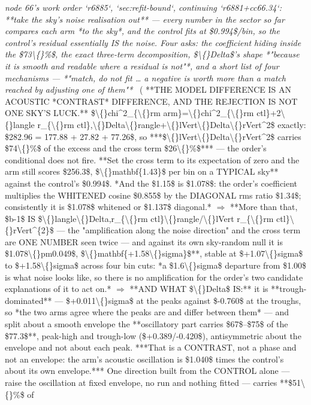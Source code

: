 \begin{description}
\textit{node 66's work order `r6885`, `sec:refit-bound`, continuing `r6881+cc66.34`: **take the sky's noise realisation out** --- every number in the sector so far compares each arm *to the sky*, and the control fits at \$0.994\$/bin, so the control's residual essentially IS the noise. Four asks: the coefficient hiding inside the \$73\textbackslash\{\}\%\$, the exact three-term decomposition, \$\textbackslash\{\}Delta\$'s shape *"because it is smooth and readable where a residual is not"*, and a short list of four mechanisms --- *"match, do not fit \ldots{} a negative is worth more than a match reached by adjusting one of them"*} \ ( **THE MODEL DIFFERENCE IS AN ACOUSTIC *CONTRAST* DIFFERENCE, AND THE REJECTION IS NOT ONE SKY'S LUCK.** \$\textbackslash\{\}chi\textasciicircum{}2\_\{\textbackslash\{\}rm arm\}=\textbackslash\{\}chi\textasciicircum{}2\_\{\textbackslash\{\}rm ctl\}+2\textbackslash\{\}langle r\_\{\textbackslash\{\}rm ctl\},\textbackslash\{\}Delta\textbackslash\{\}rangle+\textbackslash\{\}lVert\textbackslash\{\}Delta\textbackslash\{\}rVert\textasciicircum{}2\$ exactly: \$282.96 = 177.88 + 27.82 + 77.26\$, so ***\$\textbackslash\{\}lVert\textbackslash\{\}Delta\textbackslash\{\}rVert\textasciicircum{}2\$ carries \$74\textbackslash\{\}\%\$ of the excess and the cross term \$26\textbackslash\{\}\%\$*** --- the order's conditional does not fire. **Set the cross term to its expectation of zero and the arm still scores \$256.3\$, \$\textbackslash\{\}mathbf\{1.43\}\$ per bin on a TYPICAL sky** against the control's \$0.994\$.  *And the \$1.15\$ is \$1.078\$: the order's coefficient multiplies the WHITENED cosine \$0.855\$ by the DIAGONAL rms ratio \$1.34\$; consistently it is \$1.078\$ whitened or \$1.137\$ diagonal.* \ensuremath{\Rightarrow}  **More than that, \$b-1\$ IS \$\textbackslash\{\}langle\textbackslash\{\}Delta,r\_\{\textbackslash\{\}rm ctl\}\textbackslash\{\}rangle/\textbackslash\{\}lVert r\_\{\textbackslash\{\}rm ctl\}\textbackslash\{\}rVert\textasciicircum{}\{2\}\$ --- the "amplification along the noise direction" and the cross term are ONE NUMBER seen twice --- and against its own sky-random null it is \$1.078\textbackslash\{\}pm0.049\$, \$\textbackslash\{\}mathbf\{+1.58\textbackslash\{\}sigma\}\$**, stable at \$+1.07\textbackslash\{\}sigma\$ to \$+1.58\textbackslash\{\}sigma\$ across four bin cuts: *a \$1.6\textbackslash\{\}sigma\$ departure from \$1.00\$ is what noise looks like, so there is no amplification for the order's two candidate explanations of it to act on.* \ensuremath{\Rightarrow}  **AND WHAT \$\textbackslash\{\}Delta\$ IS:** it is **trough-dominated** --- \$+0.011\textbackslash\{\}sigma\$ at the peaks against \$-0.760\$ at the troughs, so *the two arms agree where the peaks are and differ between them* --- and split about a smooth envelope the **oscillatory part carries \$67\$--\$75\$ of the \$77.3\$**, peak-high and trough-low (\$+0.389/-0.420\$), antisymmetric about the envelope and not about each peak. ***That is a CONTRAST, not a phase and not an envelope: the arm's acoustic oscillation is \$1.040\$ times the control's about its own envelope.***  One direction built from the CONTROL alone --- raise the oscillation at fixed envelope, no run and nothing fitted --- carries **\$51\textbackslash\{\}\%\$ of 
\end{description}
